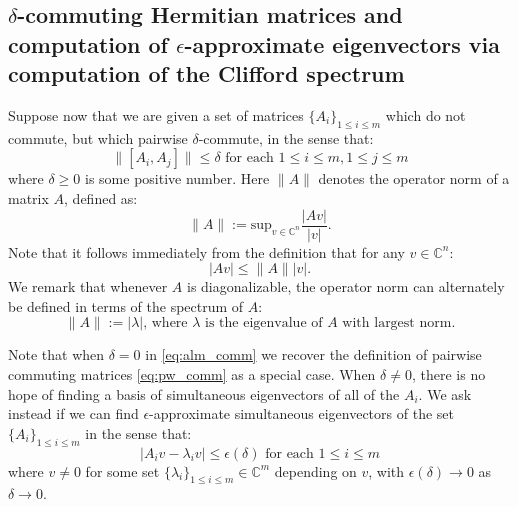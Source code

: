 \documentclass[a4paper]{article}
\begin{document}
\subsection{$\delta$-commuting Hermitian matrices and computation of $\epsilon$-approximate eigenvectors via computation of the Clifford spectrum} \label{sec:spec_app}

Suppose now that we are given a set of matrices $\{ A_i \}_{1 \leq i \leq m}$ which {do not commute}, but which {pairwise $\delta$-commute}, in the sense that: 
\begin{equation} \label{eq:alm_comm}
	\| [A_i,A_j] \| \leq \delta \text{ for each } 1 \leq i \leq m, 1 \leq j \leq m	
\end{equation}
where $\delta \geq 0$ is some positive number. Here $\| A \|$ denotes the {operator norm} of a matrix $A$, defined as:
\begin{equation}
	\| A \| := \text{sup}_{v \in \mathbb{C}^n} \frac{ | A v | }{ | v | }.
\end{equation}
Note that it follows immediately from the definition that for any $v \in \mathbb{C}^n$:
\begin{equation}
	| A v | \leq \| A \| | v |.
\end{equation}
We remark that whenever $A$ is diagonalizable, the operator norm can alternately be defined in terms of the spectrum of $A$: 
\begin{equation}
	\| A \| := \text{$|\lambda|$, where $\lambda$ is the eigenvalue of $A$ with largest norm.}
\end{equation}

Note that when $\delta = 0$ in \eqref{eq:alm_comm} we recover the definition of pairwise commuting matrices \eqref{eq:pw_comm} as a special case. When $\delta \neq 0$, there is no hope of finding a basis of simultaneous eigenvectors of all of the $A_i$. We ask instead if we can find {$\epsilon$-approximate simultaneous eigenvectors} of the set $\{A_i\}_{1 \leq i \leq m}$ in the sense that: 
\begin{equation} \label{eq:app_evec}
	| A_i v - \lambda_i v | \leq \epsilon(\delta) \text{ for each } 1 \leq i \leq m
\end{equation}
where $v \neq 0$ for some set $\{\lambda_i\}_{1 \leq i \leq m} \in \mathbb{C}^m$ depending on $v$, with $\epsilon(\delta) \rightarrow 0$ as $\delta \rightarrow 0$. 
\end{document}
